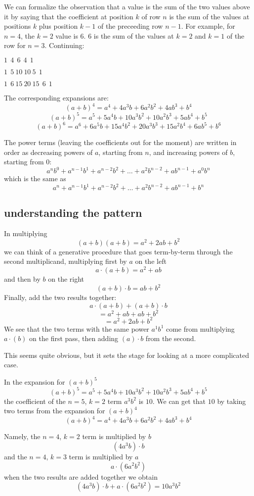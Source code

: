 \documentclass[11pt, oneside]{article}   	%
\begin{document}
We can formalize the observation that a value is the sum of the two values above it by saying that the coefficient at position $k$ of row $n$ is the sum of the values at positions $k$ plus position $k-1$ of the preceeding row $n-1$.  For example, for $n=4$, the $k=2$ value is $6$.  $6$ is the sum of the values at $k=2$ and $k=1$ of the row for $n=3$.  Continuing:

$1 \ \ 4 \ \ 6 \ \ 4 \ \ 1$

$1 \ \ 5 \ 10 \ 10 \ 5 \ \ 1$

$1 \ \ 6 \ 15 \ 20 \ 15 \ \ 6 \ \ 1$

The corresponding expansions are:
\[ (a+b)^4 = a^4 + 4a^3b + 6a^2b^2 + 4ab^3 + b^4 \]
\[ (a+b)^5 = a^5 + 5a^4b + 10a^3b^2 + 10a^2b^3 + 5ab^4 + b^5 \]
\[ (a+b)^6 = a^6 + 6a^5b + 15a^4b^2 + 20a^3b^3 + 15a^2b^4 + 6ab^5 + b^6 \]

The power terms (leaving the coefficients out for the moment) are written in order as decreasing powers of $a$, starting from $n$, and increasing powers of $b$, starting from $0$:
\[ a^nb^0 + a^{n-1}b^1 + a^{n-2}b^2 + \dots + a^2b^{n-2} + ab^{n-1} + a^0b^n \]
which is the same as
\[ a^n + a^{n-1}b^1 + a^{n-2}b^2 + \dots + a^2b^{n-2} + ab^{n-1} + b^n \]

\subsection*{understanding the pattern}
In multiplying
\[ (a + b)(a + b) = a^2 + 2ab + b^2 \]
we can think of a generative procedure that goes term-by-term through the second multiplicand, multiplying first by $a$ on the left
\[ a \cdot (a + b) = a^2 + ab \]
and then by $b$ on the right
\[ (a + b) \cdot b = ab + b^2 \]
Finally, add the two results together:
\[ a \cdot (a + b) + (a + b) \cdot b \]
\[ = a^2 + ab + ab + b^2 \]
\[ = a^2 + 2ab + b^2 \]
We see that the two terms with the same power $a^1b^1$ come from multiplying $a \cdot (b)$ on the first pass, then adding $(a) \cdot b$ from the second.

This seems quite obvious, but it sets the stage for looking at a more complicated case.

In the expansion for $(a+b)^5$
\[ (a+b)^5 = a^5 + 5a^4b + 10a^3b^2 + 10a^2b^3 + 5ab^4 + b^5 \]
the coefficient of the $n=5$, $k=2$ term $a^3b^2$ is $10$.  We can get that $10$ by taking two terms from the expansion for $(a+b)^4$
\[ (a+b)^4 = a^4 + 4a^3b + 6a^2b^2 + 4ab^3 + b^4 \]

Namely, the $n=4$, $k = 2$ term is multiplied by $b$
\[ (4a^3b) \cdot b \]
and the $n=4$, $k=3$ term is multiplied by $a$
\[ a \cdot (6a^2b^2)  \]
when the two results are added together we obtain
\[ (4a^3b) \cdot b + a \cdot (6a^2b^2) = 10a^3b^2 \]
\end{document}
